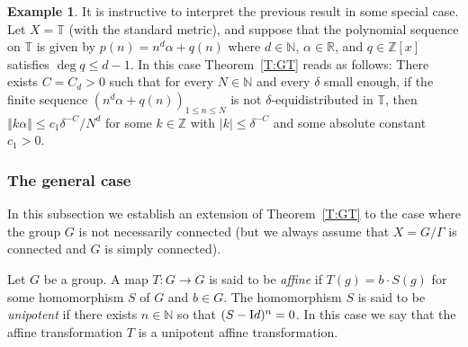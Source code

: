 \documentclass[11pt]{amsart}
\newcommand{\T}{\mathbb{T}}
\newcommand{\R}{\mathbb{R}}
\newcommand{\N}{\mathbb{N}}
\newcommand{\Z}{\mathbb{Z}}
\newcommand{\norm}[1]{\left\Vert #1\right\Vert}
\theoremstyle{plain}
\newtheorem{theorem}{Theorem}[section]
\theoremstyle{definition}
\newtheorem{example}{Example}
\theoremstyle{remark}
\begin{document}
\begin{example}
  It is instructive to interpret the previous result in some special
  case. Let $X=\T$ (with the standard metric), and suppose that
  the polynomial
  sequence on $\T$ is given by $p(n)=n^d\alpha+q(n)$ where $d\in \N$,
  $\alpha\in \R$, and $q\in\Z[x]$ satisfies $\deg{q}\leq d-1$. In this case
  Theorem~\ref{T:GT} reads as follows: There exists $C=C_d>0$ such
  that for every $N\in\N$ and every  $\delta$ small enough,
  if the finite sequence $(n^d\alpha+q(n))_{1\leq n\leq N}$ is not
  $\delta$-equidistributed in $\T$, then $\norm{k\alpha}\leq
  c_1\delta^{-C}/N^d$ for some $k\in \Z$ with $|k|\leq \delta^{-C}$
  and some absolute constant $c_1>0$.
\end{example}


\subsubsection{The general case} \label{S:GT2} In this subsection we
establish an extension of Theorem~\ref{T:GT} to the case where the
group $G$ is not necessarily connected (but we always assume that
$X=G/\Gamma$ is connected and $G$ is simply connected).

Let $G$ be a group.  A map $T\colon G\to G$ is said to be
\emph{affine} if $T(g) = b\cdot S(g)$ for some homomorphism $S$ of $G$
and $b\in G$.  The homomorphism $S$ is said to be {\em unipotent} if
there exists $n\in\N$ so that $(S-{\text Id})^{n}=0$.  In this case we
say that the affine transformation $T$ is a unipotent affine
transformation.
\end{document}

